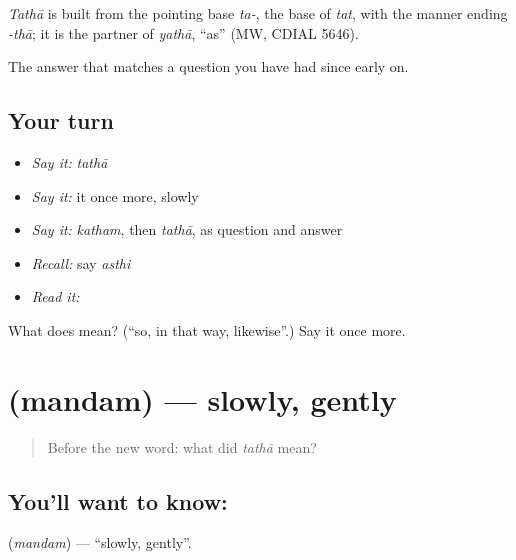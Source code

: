 \begin{cousinweb}
\emph{Tathā} is built from the pointing base \emph{ta-}, the base of \emph{tat}, with the manner ending \emph{-thā}; it is the partner of \emph{yathā}, \textquotedblleft{}as\textquotedblright{} (MW, CDIAL 5646).
\end{cousinweb}

\begin{grammarlens}[title={What you've built}]
The answer that matches a question you have had since early on.
\end{grammarlens}

\subsection*{Your turn}
\begin{itemize}
\raggedright
  \item \emph{Say it:} \emph{tathā}
  \item \emph{Say it:} it once more, slowly
  \item \emph{Say it:} \emph{katham}, then \emph{tathā}, as question and answer
  \item \emph{Recall:} say \emph{asthi}
  \item \emph{Read it:} \textbf{}
\end{itemize}

\begin{tcolorbox}[breakable,colback=teal!4,colframe=teal!35!black,title={Before you move on}]
What does  mean? (\textquotedblleft{}so, in that way, likewise\textquotedblright{}.) Say it once more.
\end{tcolorbox}
\section[\texorpdfstring{\sk{मन्दम्} (mandam)}{मन्दम् (mandam)}]{ (mandam) — slowly, gently}

\label{lesson:SA-C36-slowly}



\begin{quote}
Before the new word: what did \emph{tathā} mean?
\end{quote}

\subsection*{You'll want to know: }
\textbf{} (\emph{mandam}) — \textquotedblleft{}slowly, gently\textquotedblright{}.


